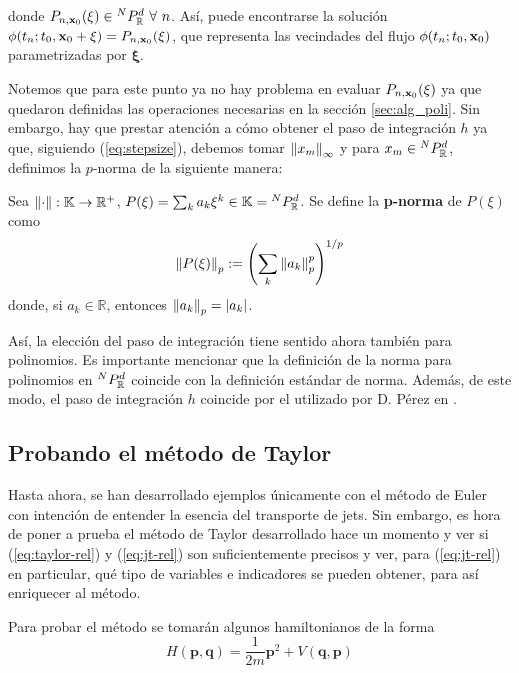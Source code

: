 donde $P_{n,\xo}(\xi) \in \pkk{N}{d} \ \forall \ n$. Así, puede encontrarse la solución $\phi(t_n;t_0,\mathbf{x}_0 + \mathbf{\xi}) = P_{n,\mathbf{x}_0}(\xi)$, que representa las vecindades del flujo $\phi(t_n;t_0,\mathbf{x}_0)$ parametrizadas por $\mathbf{\xi}$.

Notemos que para este punto ya no hay problema en evaluar $P_{n,\mathbf{x}_0}(\xi)$ ya que quedaron definidas las operaciones necesarias en la sección \ref{sec:alg_poli}. Sin embargo, hay que prestar atención a cómo obtener el paso de integración $h$ ya que, siguiendo (\ref{eq:stepsize}), debemos tomar $\left\lVert x_m\right\rVert_\infty$ y para $x_m \in {^{N}P_{\mathbb{R}}^ d }$, definimos la $p$-norma de la siguiente manera:

\begin{definicion}
Sea $\left\lVert\cdot\right\rVert : \mathbb{K} \to \mathbb{R}^+$, $P(\mathbf{\xi}) = \sum_{k} a_k \mathbf{\xi}^k \in \mathbb{K} = {^{N}P_{\mathbb{R}}^ d }$. Se define la \textbf{p-norma} de $P(\xi)$ como
\begin{equation}
 \left\lVert P(\mathbf{\xi})\right\rVert_p := \left( \sum_{k} \left\lVert a_k\right\rVert_p^p \right)^{1/p}
 \label{eq:poly-norm}
\end{equation}  
donde, si $a_k \in \mathbb{R}$, entonces $\left\lVert a_k\right\rVert_p = |a_k|$.
\end{definicion}

Así, la elección del paso de integración tiene sentido ahora también para polinomios. Es importante mencionar que la definición de la norma para polinomios en ${^{N}P_{\mathbb{R}}^ d }$ coincide con la definición estándar de norma. Además, de este modo, el paso de integración $h$ coincide por el utilizado por D. Pérez en \cite{Daniel2015}.

\subsection{Probando el método de Taylor}
\label{sec:benchmark-taylor}

Hasta ahora, se han desarrollado ejemplos únicamente con el método de Euler con intención de entender la esencia del transporte de jets. Sin embargo, es hora de poner a prueba el método de Taylor desarrollado hace un momento y ver si (\ref{eq:taylor-rel}) y (\ref{eq:jt-rel}) son suficientemente precisos y ver, para (\ref{eq:jt-rel}) en particular, qué tipo de variables e indicadores se pueden obtener, para así enriquecer al método.

Para probar el método se tomarán algunos hamiltonianos de la forma
\begin{equation}
 H(\mathbf{p},\mathbf{q}) = \frac{1}{2m}\mathbf{p}^2 + V(\mathbf{q},\mathbf{p})
 \label{eq:hamiltonian}
\end{equation}

